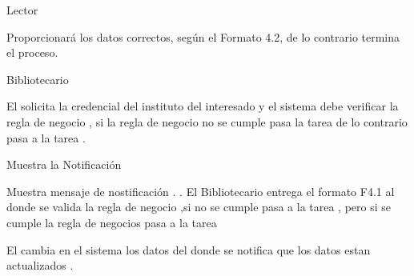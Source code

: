 \begin{PDescripcion}

  \Ppaso Lector

    \begin{enumerate}

      \Ppaso[\itarea]  Proporcionará los datos correctos, según el Formato 4.2, de lo contrario termina el proceso.
	

    \end{enumerate}
    
    
  \Ppaso Bibliotecario 

    \begin{enumerate}

      \Ppaso[\itarea]  El  solicita la credencial del instituto del  interesado y el sistema debe verificar la regla de negocio , si la regla de negocio no se cumple pasa la tarea  de lo contrario pasa a la tarea .


      \Ppaso[\itarea] Muestra la Notificación 
      
      \Ppaso[\itarea]  Muestra mensaje de nostificación .
      .
      \Ppaso[\itarea]  El Bibliotecario entrega el formato F4.1 al  donde se valida la regla de negocio ,si no se cumple pasa a la tarea , pero si se cumple la regla de negocios pasa a la tarea 
      
      
      \Ppaso[\itarea]  El  cambia en el sistema los datos del  donde se notifica que los datos estan actualizados  .

      
          \end{enumerate}

\end{PDescripcion}




